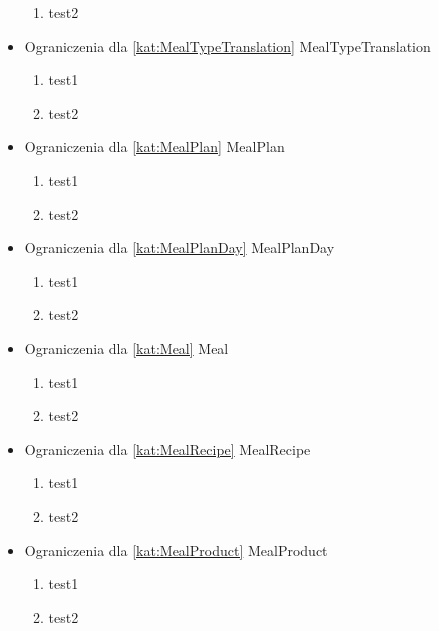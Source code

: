 \begin{itemize}[label={}]
\begin{enumerate}[label={\textbf{OGR/\protect\threedigits{\arabic{enumi}}}}, wide, labelwidth=!, resume]
        \item test2
    \end{enumerate}
    \item Ograniczenia dla \ref{kat:MealTypeTranslation} MealTypeTranslation
    \begin{enumerate}[label={\textbf{OGR/\protect\threedigits{\arabic{enumi}}}}, wide, labelwidth=!, resume]
        \item test1
        \item test2
    \end{enumerate}
    \item Ograniczenia dla \ref{kat:MealPlan} MealPlan
    \begin{enumerate}[label={\textbf{OGR/\protect\threedigits{\arabic{enumi}}}}, wide, labelwidth=!, resume]
        \item test1
        \item test2
    \end{enumerate}
    \item Ograniczenia dla \ref{kat:MealPlanDay} MealPlanDay
    \begin{enumerate}[label={\textbf{OGR/\protect\threedigits{\arabic{enumi}}}}, wide, labelwidth=!, resume]
        \item test1
        \item test2
    \end{enumerate}
    \item Ograniczenia dla \ref{kat:Meal} Meal
    \begin{enumerate}[label={\textbf{OGR/\protect\threedigits{\arabic{enumi}}}}, wide, labelwidth=!, resume]
        \item test1
        \item test2
    \end{enumerate}
    \item Ograniczenia dla \ref{kat:MealRecipe} MealRecipe
    \begin{enumerate}[label={\textbf{OGR/\protect\threedigits{\arabic{enumi}}}}, wide, labelwidth=!, resume]
        \item test1
        \item test2
    \end{enumerate}
    \item Ograniczenia dla \ref{kat:MealProduct} MealProduct
    \begin{enumerate}[label={\textbf{OGR/\protect\threedigits{\arabic{enumi}}}}, wide, labelwidth=!, resume]
        \item test1
        \item test2

\end{enumerate}
\end{itemize}
